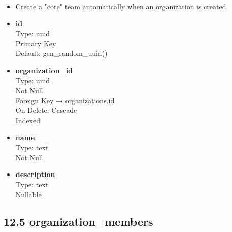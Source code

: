 \documentclass[12pt]{article}
\begin{document}
\begin{itemize}
    \item Create a "core" team automatically when an organization is created.
    \item \textbf{id} \\
    Type: uuid \\
    Primary Key \\
    Default: gen\_random\_uuid()

    \item \textbf{organization\_id} \\
    Type: uuid \\
    Not Null \\
    Foreign Key → organizations.id \\
    On Delete: Cascade \\
    Indexed

    \item \textbf{name} \\
    Type: text \\
    Not Null

    \item \textbf{description} \\
    Type: text \\
    Nullable
\end{itemize}

\subsection*{12.5 organization\_members}
\end{document}
